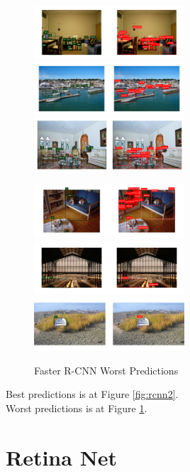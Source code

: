 \documentclass[12pt]{article}
\begin{document}
\begin{figure}[htbp]
    {\raggedright
    \includegraphics[width=0.5\textwidth]{images/rcnn_res/rcnn_w1.png}
    \includegraphics[width=0.5\textwidth]{images/rcnn_res/rcnn_w2.png}
    \includegraphics[width=0.5\textwidth]{images/rcnn_res/rcnn_w3.png}}
    {\raggedleft
    \includegraphics[width=0.5\textwidth]{images/rcnn_res/rcnn_w4.png}
    \includegraphics[width=0.5\textwidth]{images/rcnn_res/rcnn_w5.png}
    \includegraphics[width=0.5\textwidth]{images/rcnn_res/rcnn_w6.png}}
    \caption{Faster R-CNN Worst Predictions}
    \label{fig:rcnn3}
\end{figure}

Best predictions is at Figure \ref{fig:rcnn2}.
\\
Worst predictions is at Figure \ref{fig:rcnn3}.

\section{Retina Net}
\end{document}
